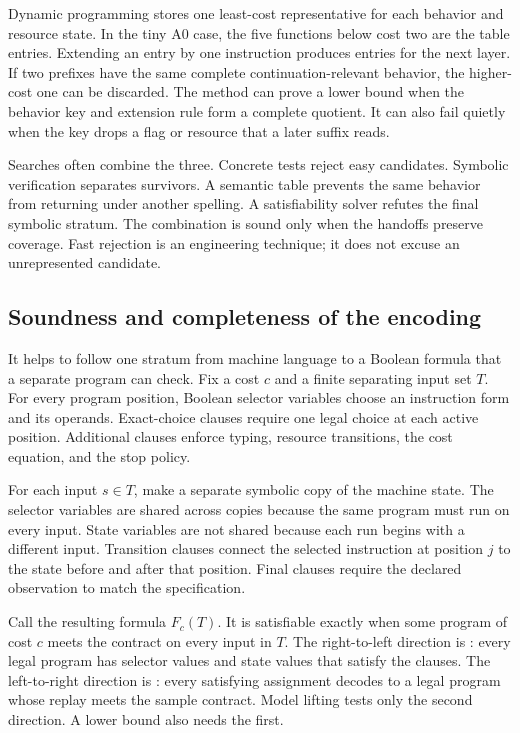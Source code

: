 Dynamic programming stores one least-cost representative for each behavior
and resource state. In the tiny A0 case, the five functions below cost two are
the table entries. Extending an entry by one instruction produces entries for
the next layer. If two prefixes have the same complete continuation-relevant
behavior, the higher-cost one can be discarded. The method can prove a lower
bound when the behavior key and extension rule form a complete quotient. It
can also fail quietly when the key drops a flag or resource that a later suffix
reads.

Searches often combine the three. Concrete tests reject easy candidates.
Symbolic verification separates survivors. A semantic table prevents the same
behavior from returning under another spelling. A satisfiability solver
refutes the final symbolic stratum. The combination is sound only when the
handoffs preserve coverage. Fast rejection is an engineering technique; it
does not excuse an unrepresented candidate.

\subsection{Soundness and completeness of the encoding}

It helps to follow one stratum from machine language to a Boolean formula that
a separate program can check. Fix a cost \(c\) and a finite separating input
set \(T\). For every
program position, Boolean selector variables choose an instruction form and
its operands. Exact-choice clauses require one legal choice at each active
position. Additional clauses enforce typing, resource transitions, the cost
equation, and the stop policy.

For each input \(s\in T\), make a separate symbolic copy of the machine state.
The selector variables are shared across copies because the same program must
run on every input. State variables are not shared because each run begins
with a different input. Transition clauses connect the selected instruction
at position \(j\) to the state before and after that position. Final clauses
require the declared observation to match the specification.

Call the resulting formula \(F_c(T)\). It is satisfiable exactly when some
program of cost \(c\) meets the contract on every input in \(T\).
The right-to-left direction is : every legal
program has selector values and state values that satisfy the clauses. The
left-to-right direction is : every satisfying
assignment decodes to a legal program whose replay meets the sample contract.
Model lifting tests only the second direction. A lower bound also needs the
first.

